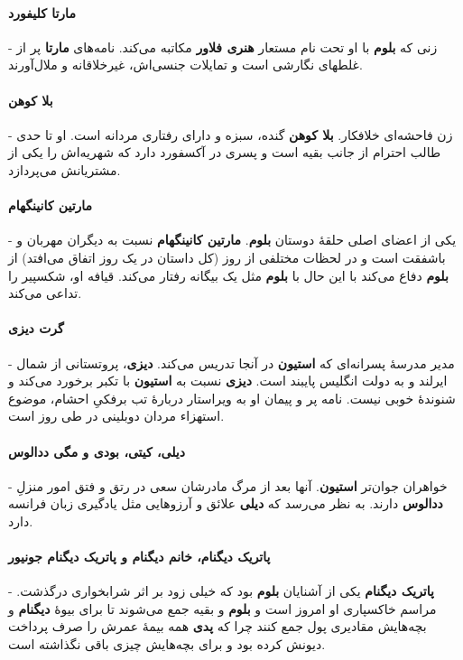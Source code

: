 \documentclass[12pt]{book}
\newcommand{\noun}[1]{{\textbf{#1}}}
\begin{document}
    \paragraph{\noun{مارتا کلیفورد}\protect{}} -
    زنی که \noun{بلوم} با او تحت نام مستعار \noun{هنری فلاور} مکاتبه می‌کند. نامه‌های \noun{مارتا} پر از غلطهای نگارشی است و تمایلات جنسی‌اش، غیرخلاقانه و ملال‌آورند.
    \paragraph{\noun{بلا کوهن}\protect{}} -
    زن فاحشه‌ای خلافکار. \noun{بلا کوهن} گنده، سبزه و دارای رفتاری مردانه است. او تا حدی طالب احترام از جانب بقیه است و پسری در آکسفورد دارد که شهریه‌اش را یکی از مشتریانش می‌پردازد.
    \paragraph{\noun{مارتین کانینگهام}\protect{}} -
    یکی از اعضای اصلی حلقهٔ دوستان \noun{بلوم}. \noun{مارتین کانینگهام}  نسبت به دیگران مهربان و باشفقت است و در لحظات مختلفی از روز (کل داستان در یک روز اتفاق می‌افتد) از \noun{بلوم} دفاع می‌کند با این حال با \noun{بلوم} مثل یک بیگانه رفتار می‌کند. قیافه او، شکسپیر را تداعی می‌کند.
    \paragraph{\noun{گرت دیزی}\protect{}} -
    مدیر مدرسهٔ پسرانه‌ای که \noun{استیون} در آنجا تدریس می‌کند. \noun{دیزی}، پروتستانی از شمال ایرلند و به دولت انگلیس پایبند است. \noun{دیزی} نسبت به \noun{استیون} با تکبر برخورد می‌کند و شنوندهٔ خوبی نیست. نامه پر و پیمان او به ویراستار دربارهٔ تب برفکیِ احشام، موضوع استهزاء مردان دوبلینی در طی روز است.
    \paragraph{\noun{دیلی، کیتی، بودی و مگی ددالوس}\protect{}} -
    خواهران جوان‌تر \noun{استیون}. آنها بعد از مرگ مادرشان سعی در رتق و فتق امور منزلِ \noun{ددالوس} دارند. به نظر می‌رسد که \noun{دیلی} علائق و آرزوهایی مثل یادگیری زبان فرانسه دارد.
    \paragraph{\noun{پاتریک دیگنام، خانم دیگنام و پاتریک دیگنام جونیور}\protect{}} -
    \noun{پاتریک دیگنام} یکی از آشنایان \noun{بلوم} بود که خیلی زود بر اثر شرابخواری درگذشت. مراسم خاکسپاری او امروز است و \noun{بلوم} و بقیه جمع می‌شوند تا برای بیوهٔ \noun{دیگنام} و بچه‌هایش مقادیری پول جمع کنند چرا که \noun{پدی} همه بیمهٔ عمرش را صرف پرداخت دیونش کرده بود و برای بچه‌هایش چیزی باقی نگذاشته است.
\end{document}
